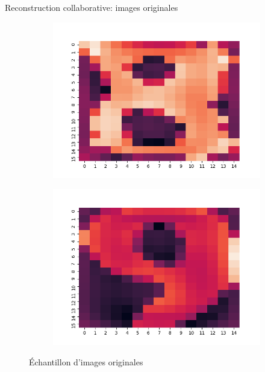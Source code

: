 \documentclass[hyperref={pdfpagelabels=false}]{beamer}
\begin{document}
\begin{frame}{Reconstruction collaborative: images originales}
\begin{figure}[h]
\begin{subfigure}[c]{0.18\textwidth}
                \includegraphics[scale=.12]{o8}
            \end{subfigure}
            \begin{subfigure}[c]{0.18\textwidth}
                \includegraphics[scale=.12]{o9}
            \end{subfigure}
            \caption{Échantillon d'images originales}
        \end{figure}
    \end{frame}
\end{document}
